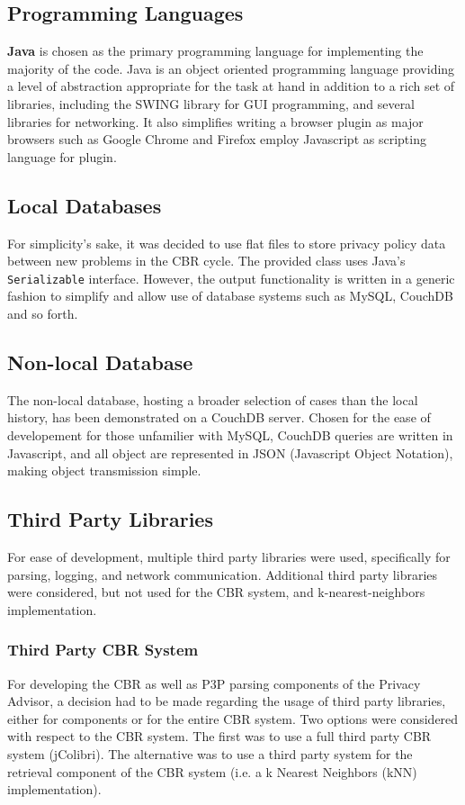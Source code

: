 \subsection{Programming Languages}
\textbf{Java} is chosen as the primary programming language for implementing the majority of the code. Java is an object oriented programming language providing a level of abstraction appropriate for the task at hand in addition to a rich set of libraries, including the SWING library for GUI programming, and several libraries for networking. It also simplifies writing a browser plugin as major browsers such as Google Chrome and Firefox employ Javascript as scripting language for plugin.

\subsection{Local Databases}
For simplicity's sake, it was decided to use flat files to store privacy policy data between new problems in the CBR cycle. The provided class uses Java's \texttt{Serializable} interface. However, the output functionality is written in a generic fashion to simplify and allow use of database systems such as MySQL, CouchDB and so forth. 

\subsection{Non-local Database}
The non-local database, hosting a broader selection of cases than the local history, has been demonstrated on a CouchDB server. Chosen for the ease of developement for those unfamilier with MySQL, CouchDB queries are written in Javascript, and all object are represented in JSON (Javascript Object Notation), making object transmission simple.

\subsection{Third Party Libraries}
For ease of development, multiple third party libraries were used, specifically for parsing, logging, and network communication. Additional third party libraries were considered, but not used for the CBR system, and k-nearest-neighbors implementation.
 
\subsubsection{Third Party CBR System}
For developing the CBR as well as P3P parsing components of the Privacy Advisor, a decision had to be made regarding the usage of third party libraries, either for components or for the entire CBR system. Two options were considered with respect to the CBR system. The first was to use a full third party CBR system (jColibri). The alternative was to use a third party system for the retrieval component of the CBR system (i.e. a k Nearest Neighbors (kNN) implementation). %


